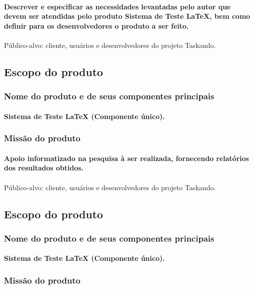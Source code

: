 		\paragraph{Descrever e especificar as necessidades levantadas pelo autor que devem ser atendidas pelo produto Sistema de Teste LaTeX, bem como definir para os desenvolvedores o produto a ser feito.}
\paragraph{}Público-alvo: cliente, usuários e desenvolvedores do projeto Taskando.
	\subsection{Escopo do produto}
		\subsubsection{Nome do produto e de seus componentes principais}
			\paragraph{Sistema de Teste LaTeX (Componente único). }
		\subsubsection{Missão do produto}
			\paragraph{Apoio informatizado na pesquisa à ser realizada, fornecendo relatórios dos resultados obtidos.}
			\paragraph{}Público-alvo: cliente, usuários e desenvolvedores do projeto Taskando.
	\subsection{Escopo do produto}
		\subsubsection{Nome do produto e de seus componentes principais}
			\paragraph{Sistema de Teste LaTeX (Componente único). }
		\subsubsection{Missão do produto}

